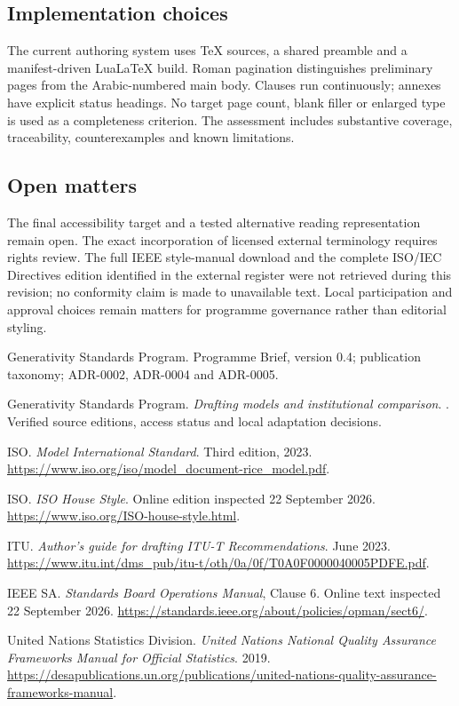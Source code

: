 \documentclass[11pt,a4paper]{article}
\begin{document}
\subsection{Implementation choices}
The current authoring system uses TeX sources, a shared preamble and a manifest-driven LuaLaTeX build. Roman pagination distinguishes preliminary pages from the Arabic-numbered main body. Clauses run continuously; annexes have explicit status headings. No target page count, blank filler or enlarged type is used as a completeness criterion. The assessment includes substantive coverage, traceability, counterexamples and known limitations.

\subsection{Open matters}
The final accessibility target and a tested alternative reading representation remain open. The exact incorporation of licensed external terminology requires rights review. The full IEEE style-manual download and the complete ISO/IEC Directives edition identified in the external register were not retrieved during this revision; no conformity claim is made to unavailable text. Local participation and approval choices remain matters for programme governance rather than editorial styling.

\GSPbibliography
\begin{enumerate}[label={[\arabic*]}]
\item Generativity Standards Program. Programme Brief, version 0.4; publication taxonomy; ADR-0002, ADR-0004 and ADR-0005.
\item Generativity Standards Program. \emph{Drafting models and institutional comparison}. . Verified source editions, access status and local adaptation decisions.
\item ISO. \emph{Model International Standard}. Third edition, 2023. \url{https://www.iso.org/iso/model_document-rice_model.pdf}.
\item ISO. \emph{ISO House Style}. Online edition inspected 22 September 2026. \url{https://www.iso.org/ISO-house-style.html}.
\item ITU. \emph{Author's guide for drafting ITU-T Recommendations}. June 2023. \url{https://www.itu.int/dms_pub/itu-t/oth/0a/0f/T0A0F0000040005PDFE.pdf}.
\item IEEE SA. \emph{Standards Board Operations Manual}, Clause 6. Online text inspected 22 September 2026. \url{https://standards.ieee.org/about/policies/opman/sect6/}.
\item United Nations Statistics Division. \emph{United Nations National Quality Assurance Frameworks Manual for Official Statistics}. 2019. \url{https://desapublications.un.org/publications/united-nations-quality-assurance-frameworks-manual}.
\end{enumerate}
\end{document}
